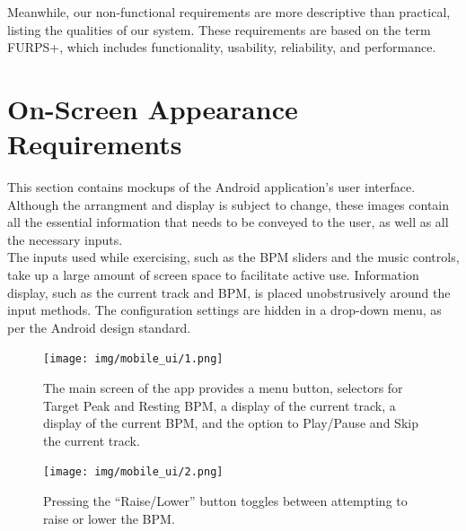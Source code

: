 \documentclass[letterpaper,english, 12pt]{scrreprt}
\begin{document}
Meanwhile, our non-functional requirements are more descriptive than practical,
listing the qualities of our system. These requirements are based on the term
FURPS+, which includes functionality, usability, reliability, and performance.

\section{On-Screen Appearance Requirements}

This section contains mockups of the Android application's user interface.
Although the arrangment and display is subject to change, these images contain all the essential information that needs to be conveyed to the user, as well as all the necessary inputs. \\
The inputs used while exercising, such as the BPM sliders and the music controls, take up a large amount of screen space to facilitate active use. Information display, such as the current track and BPM, is placed unobstrusively around the input methods. The configuration settings are hidden in a drop-down menu, as per the Android design standard.\\

\begin{figure}[H]
	\centering
	\texttt{[image: img/mobile\_ui/1.png]}\\
	\caption{The main screen of the app provides a menu button, selectors for Target Peak and Resting BPM, a display of the current track, a display of the current BPM, and the option to Play/Pause and Skip the current track.}
\end{figure}

\begin{figure}[H]
	\centering
	\texttt{[image: img/mobile\_ui/2.png]}\\
	\caption{Pressing the ``Raise/Lower'' button toggles between attempting to raise or lower the BPM.}
\end{figure}
\end{document}
